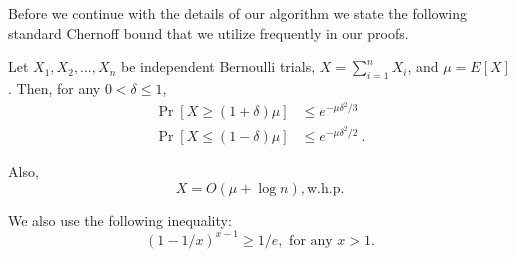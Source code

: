 %
Before we continue with the details of our algorithm we state the following standard Chernoff bound that we utilize frequently in our proofs. 

\begin{proposition}[Chernoff]
Let $X_1, X_2, \ldots, X_n$ be independent Bernoulli trials,
$X = \sum_{i=1}^n X_i$, and $\mu = E[X]$. Then, for any $0 < \delta \le 1$,
\begin{align}
\label{eq:chernoff-upper}
\Pr[X \ge (1+\delta)\mu] & \le e^{-\mu \delta^2/3}     \\
\label{eq:chernoff-lower}
\Pr[X \le (1-\delta)\mu] & \le e^{-\mu \delta^2/2}\ .
\end{align}
\iffalse
\begin{equation}
\Pr[X \ge (1+\delta)\mu] \le e^{-\mu \delta^2/3} %
\label{eq:chernoff-upper}
\end{equation}
and
\begin{equation}
\Pr[X \le (1-\delta)\mu] \le e^{-\mu \delta^2/2}\ .
\label{eq:chernoff-lower}
\end{equation}
\fi
Also,
\begin{equation}
    X = O(\mu + \log n), \text{w.h.p.}
    \label{eq:concentration}
\end{equation}
\label{P:chernoff}
\end{proposition}

We also use the following inequality:
\begin{equation}
(1-1/x)^{x-1} \ge 1/e, \text{ for any } x > 1.
\label{eq:inv-e}
\end{equation}


\iffalse
\begin{corollary}
Let $X_1, X_2, \ldots, X_m$ be independent Bernoulli trials.
Let $X = \sum_{i=1}^n$ and $\mu = E[X]$. Assume $\mu = \Omega(\log n)$. Then, $X = O(\mu)$, w.h.p.
\label{C:chernoff}
\end{corollary}
\fi
